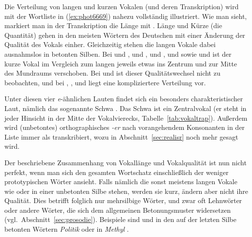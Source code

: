 
Die Verteilung von langen und kurzen Vokalen (und deren Transkription) wird mit der Wortliste in (\ref{ex:phot6669}) nahezu vollständig illustriert.
Wie man sieht, markiert man in der Transkription die Länge mit \textipa{[:]}.
Länge und Kürze (die Quantität) gehen in den meisten Wörtern des Deutschen mit einer Änderung der Qualität des Vokals einher.
Gleichzeitig stehen die langen Vokale dabei ausnahmslos in betonten Silben.
Bei \textipa{[u:]} und \textipa{[U]}, \textipa{[o:]} und \textipa{[O]}, \textipa{[i:]} und \textipa{[I]}, \textipa{[y:]} und \textipa{[Y]} sowie \textipa{[\o:]} und \textipa{[\oe]} ist der kurze Vokal im Vergleich zum langen jeweils etwas ins Zentrum und zur Mitte des Mundraums verschoben.
Bei \textipa{[a:]} und \textipa{[a]} ist dieser Qualitätswechsel nicht zu beobachten, und bei \textipa{[e:]}, \textipa{[E:]}, \textipa{[E]} und \textipa{[@]} liegt eine kompliziertere Verteilung vor.


Unter diesen vier \textit{e}-ähnlichen Lauten findet sich ein besonders charakteristischer Laut, nämlich das sogenannte Schwa \textipa{[@]}.
Das Schwa ist ein Zentralvokal (er steht in jeder Hinsicht in der Mitte der Vokalvierecks, Tabelle~\ref{tab:vokaltrap}).
Außerdem wird (unbetontes) orthographisches \textit{-er} nach vorangehendem Konsonanten in der Liste immer als \textipa{[5]} transkribiert, wozu in Abschnitt~\ref{sec:realisr} noch mehr gesagt wird.

Der beschriebene Zusammenhang von Vokallänge und Vokalqualität ist nun nicht perfekt, wenn man sich den gesamten Wortschatz einschließlich der weniger prototypischen Wörter ansieht.
Falls nämlich die sonst meistens langen Vokale wie \textipa{[i]} oder \textipa{[u]} in einer unbetonten Silbe stehen, werden sie kurz, ändern aber nicht ihre Qualität.
Dies betrifft folglich nur mehrsilbige Wörter, und zwar oft Lehnwörter oder andere Wörter, die sich dem allgemeinen Betonungsmuster widersetzen (vgl.\ Abschnitt~\ref{sec:prosodie}).
Beispiele sind \textipa{[o]} und \textipa{[i]} in den auf der letzten Silbe betonten Wörtern \textit{Politik} \textipa{[politIk]} oder \textipa{[e]} in \textit{Methyl} \textipa{[mety:l]}.

